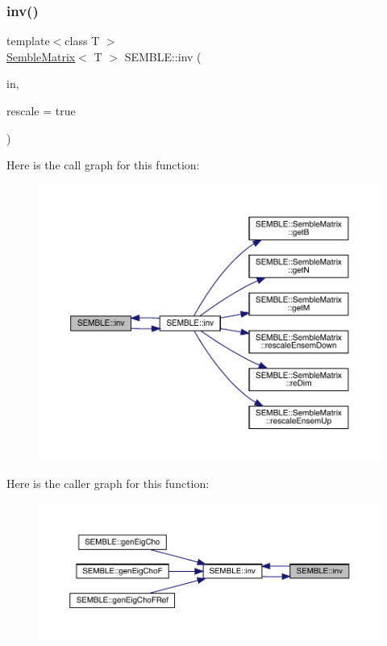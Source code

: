 \subsubsection{\texorpdfstring{inv()}{inv()}\hspace{0.1cm}{\footnotesize\ttfamily [2/2]}}
{\footnotesize\ttfamily template$<$class T $>$ \\
\mbox{\hyperlink{structSEMBLE_1_1SembleMatrix}{Semble\+Matrix}}$<$ T $>$ S\+E\+M\+B\+L\+E\+::inv (\begin{DoxyParamCaption}\item[{const \mbox{\hyperlink{structSEMBLE_1_1SembleMatrix}{Semble\+Matrix}}$<$ T $>$ \&}]{in,  }\item[{bool}]{rescale = {\ttfamily true} }\end{DoxyParamCaption})}

Here is the call graph for this function\+:
\nopagebreak
\begin{figure}[H]
\begin{center}
\leavevmode
\includegraphics[width=350pt]{d7/dfd/namespaceSEMBLE_a263c9c3830d08488f8ec27c0d728223e_cgraph}
\end{center}
\end{figure}
Here is the caller graph for this function\+:
\nopagebreak
\begin{figure}[H]
\begin{center}
\leavevmode
\includegraphics[width=350pt]{d7/dfd/namespaceSEMBLE_a263c9c3830d08488f8ec27c0d728223e_icgraph}
\end{center}
\end{figure}
\mbox{\label{namespaceSEMBLE_adf8aee09f619bd4b2d88858a50ed5eee}} 
